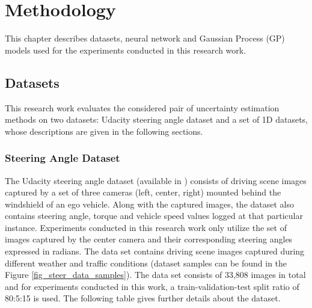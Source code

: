 

\chapter{Methodology}\label{chap_methodology}
This chapter describes datasets, neural network and Gaussian Process (GP) models used for the experiments conducted in this research work.  
\section{Datasets}
This research work evaluates the considered pair of uncertainty estimation methods on two datasets: Udacity steering angle dataset and a set of 1D datasets, whose descriptions are given in the following sections. 
\subsection{Steering Angle Dataset}
The Udacity steering angle dataset (available in \cite{udasteer}) consists of driving scene images captured by a set of three cameras (left, center, right) mounted behind the windshield of an ego vehicle. Along with the captured images, the dataset also contains steering angle, torque and vehicle speed values logged at that particular instance. Experiments conducted in this research work only utilize the set of images captured by the center camera and their corresponding steering angles expressed in radians. The data set contains driving scene images captured during different weather and traffic conditions (dataset samples can be found in the Figure \ref{fig_steer_data_samples}). The data set consists of 33,808 images in total and for experiments conducted in this work, a train-validation-test split ratio of 80:5:15 is used. The following table gives further details about the dataset.

